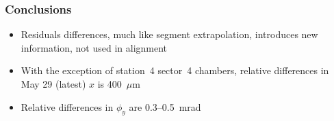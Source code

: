 \documentclass[compress]{beamer}
\begin{document}
\begin{frame}
\frametitle{Conclusions}
\begin{itemize}\setlength{\itemsep}{0.5 cm}
\item Residuals differences, much like segment extrapolation,
  introduces new information, not used in alignment
\item With the exception of station~4 sector~4 chambers, relative
  differences in May 29 (latest) $x$ is 400~$\mu$m
\item Relative differences in $\phi_y$ are 0.3--0.5~mrad
\end{itemize}
\label{numpages}
\end{frame}
\end{document}
